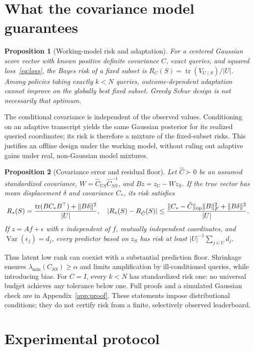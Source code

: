 \documentclass{article}
\newtheorem{proposition}{Proposition}
\newcommand{\tr}{\operatorname{tr}}
\begin{document}
\section{What the covariance model guarantees}
\label{sec:theory}
\begin{proposition}[Working-model risk and adaptation]
For a centered Gaussian score vector with known positive definite covariance $C$, exact queries, and squared loss~\eqref{eq:loss}, the Bayes risk of a fixed subset is $R_C(S)=\tr(V_{U\mid S})/|U|$. Among policies taking exactly $k<N$ queries, outcome-dependent adaptation cannot improve on the globally best fixed subset. Greedy Schur design is not necessarily that optimum.
\label{prop:risk}
\end{proposition}
The conditional covariance is independent of the observed values. Conditioning on an adaptive transcript yields the same Gaussian posterior for its realized queried coordinates; its risk is therefore a mixture of the fixed-subset risks. This justifies an offline design under the working model, without ruling out adaptive gains under real, non-Gaussian model mixtures.

\begin{proposition}[Covariance error and residual floor]
Let $\hat C\succ0$ be an assumed standardized covariance, $W=\hat C_{US}\hat C_{SS}^{-1}$, and $Bz=z_U-Wz_S$. If the true vector has mean displacement $\delta$ and covariance $C_*$, its risk satisfies
\begin{equation}
 R_*(S)=\frac{\tr(BC_*B^\top)+\|B\delta\|^2}{|U|},\quad
 |R_*(S)-R_{\hat C}(S)|\leq
 \frac{\|C_*-\hat C\|_{\rm op}\|B\|_F^2+\|B\delta\|^2}{|U|}.
 \label{eq:bound}
\end{equation}
If $z=Af+\epsilon$ with $\epsilon$ independent of $f$, mutually independent coordinates, and $\operatorname{Var}(\epsilon_j)=d_j$, every predictor based on $z_S$ has risk at least $|U|^{-1}\sum_{j\in U}d_j$.
\label{prop:bound}
\end{proposition}
Thus latent low rank can coexist with a substantial prediction floor. Shrinkage ensures $\lambda_{\min}(C_{SS})\geq\alpha$ and limits amplification by ill-conditioned queries, while introducing bias. For $C=I$, every $k<N$ has standardized risk one: no universal budget achieves any tolerance below one. Full proofs and a simulated Gaussian check are in Appendix~\ref{app:proof}. These statements impose distributional conditions; they do not certify risk from a finite, selectively observed leaderboard.

\section{Experimental protocol}
\label{sec:experiments}
\end{document}
